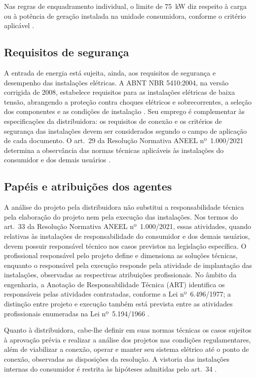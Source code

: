 Nas regras de enquadramento individual, o limite de 75~kW diz respeito à carga ou à potência de geração instalada na unidade consumidora, conforme o critério aplicável \cite[art.~23]{aneel1000}.

\subsection{Requisitos de segurança}

A entrada de energia está sujeita, ainda, aos requisitos de segurança e desempenho das instalações elétricas. A ABNT NBR 5410:2004, na versão corrigida de 2008, estabelece requisitos para as instalações elétricas de baixa tensão, abrangendo a proteção contra choques elétricos e sobrecorrentes, a seleção dos componentes e as condições de instalação \cite[seções~5 e~6]{abnt5410}. Seu emprego é complementar às especificações da distribuidora: os requisitos de conexão e os critérios de segurança das instalações devem ser considerados segundo o campo de aplicação de cada documento. O art.~29 da Resolução Normativa ANEEL nº~1.000/2021 determina a observância das normas técnicas aplicáveis às instalações do consumidor e dos demais usuários \cite[art.~29]{aneel1000}.

\subsection{Papéis e atribuições dos agentes}

A análise do projeto pela distribuidora não substitui a responsabilidade técnica pela elaboração do projeto nem pela execução das instalações. Nos termos do art.~33 da Resolução Normativa ANEEL nº~1.000/2021, essas atividades, quando relativas às instalações de responsabilidade do consumidor e dos demais usuários, devem possuir responsável técnico nos casos previstos na legislação específica. O profissional responsável pelo projeto define e dimensiona as soluções técnicas, enquanto o responsável pela execução responde pela atividade de implantação das instalações, observadas as respectivas atribuições profissionais. No âmbito da engenharia, a Anotação de Responsabilidade Técnica (ART) identifica os responsáveis pelas atividades contratadas, conforme a Lei nº~6.496/1977; a distinção entre projeto e execução também está prevista entre as atividades profissionais enumeradas na Lei nº~5.194/1966 \cite[art.~33]{aneel1000}\cite[arts.~1º e~2º]{brasil6496}\cite[art.~7º, alíneas~b e~g]{brasil5194}.

Quanto à distribuidora, cabe-lhe definir em suas normas técnicas os casos sujeitos à aprovação prévia e realizar a análise dos projetos nas condições regulamentares, além de viabilizar a conexão, operar e manter seu sistema elétrico até o ponto de conexão, observadas as disposições da resolução. A vistoria das instalações internas do consumidor é restrita às hipóteses admitidas pelo art.~34 \cite[arts.~26, 34 e~50--54]{aneel1000}.

